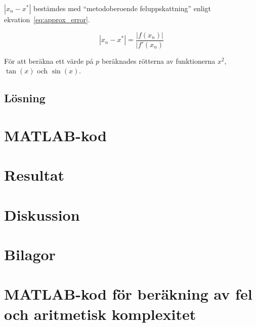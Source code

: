 \documentclass[a4paper,titlepage]{article}
\begin{document}
$|x_n - x^*|$ bestämdes med ``metodoberoende feluppskattning'' enligt 
ekvation~\ref{eq:approx_error}.

\begin{equation}
    |x_n - x^*| = \frac{|f(x_n)|}{|f'(x_n)}
\end{equation}


För att beräkna ett värde på $p$ beräknades rötterna av funktionerna $x^2$, $\tan(x)$
och $\sin(x)$.



\subsection{Lösning}


\section{MATLAB-kod}



\section{Resultat}


\section{Diskussion}



\section*{Bilagor}
\appendix

\section{MATLAB-kod för beräkning av fel och aritmetisk komplexitet}
\label{sec:testcode}
\end{document}
